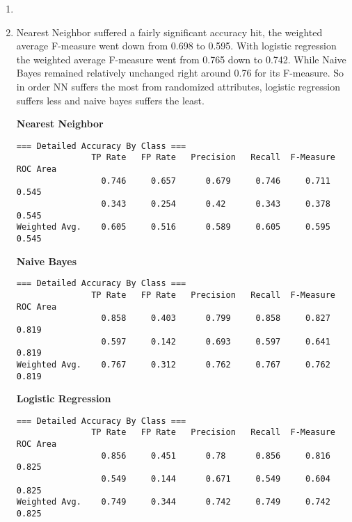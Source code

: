 \documentclass[12pt]{article}
\begin{document}
\begin{enumerate}
\begin{enumerate}
\item %

\item %

Nearest Neighbor suffered a fairly significant accuracy hit, the weighted average F-measure went down from 0.698 to 0.595. With logistic regression the weighted average F-measure went from 0.765 down to  0.742. While Naive Bayes remained relatively unchanged right around 0.76 for its F-measure. So in order NN suffers the most from randomized attributes, logistic regression suffers less and naive bayes suffers the least.

{\bf Nearest Neighbor}
\begin{verbatim}
=== Detailed Accuracy By Class ===
               TP Rate   FP Rate   Precision   Recall  F-Measure   ROC Area 
                 0.746     0.657      0.679     0.746     0.711      0.545  
                 0.343     0.254      0.42      0.343     0.378      0.545   
Weighted Avg.    0.605     0.516      0.589     0.605     0.595      0.545
\end{verbatim}

{\bf Naive Bayes}
\begin{verbatim}
=== Detailed Accuracy By Class ===
               TP Rate   FP Rate   Precision   Recall  F-Measure   ROC Area 
                 0.858     0.403      0.799     0.858     0.827      0.819 
                 0.597     0.142      0.693     0.597     0.641      0.819 
Weighted Avg.    0.767     0.312      0.762     0.767     0.762      0.819
\end{verbatim}

{\bf Logistic Regression}
\begin{verbatim}
=== Detailed Accuracy By Class ===
               TP Rate   FP Rate   Precision   Recall  F-Measure   ROC Area
                 0.856     0.451      0.78      0.856     0.816      0.825  
                 0.549     0.144      0.671     0.549     0.604      0.825 
Weighted Avg.    0.749     0.344      0.742     0.749     0.742      0.825
\end{verbatim}



\end{enumerate}
\end{enumerate}
\end{document}
